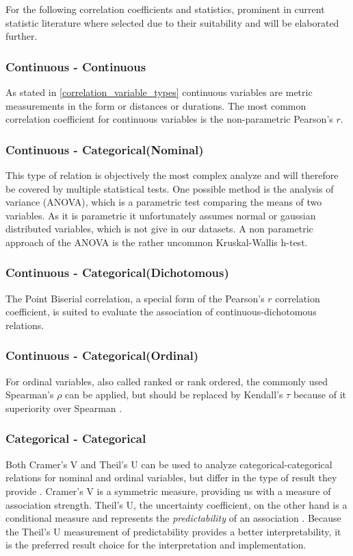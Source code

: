 \documentclass[a4paper,12pt]{report}
\begin{document}
For the following correlation coefficients and statistics, prominent in current statistic literature where selected due to their suitability and will be elaborated further.

\subsubsection{Continuous - Continuous}
As stated in \ref{correlation_variable_types} continuous variables are metric measurements in the form or distances or durations. The most common correlation coefficient for continuous variables is the non-parametric Pearson's $r$.

\subsubsection{Continuous - Categorical(Nominal)}
This type of relation is objectively the most complex analyze and will therefore be covered by multiple statistical tests. One possible method is the analysis of variance (ANOVA), which is a parametric test comparing the means of two variables. As it is parametric it unfortunately assumes normal or gaussian distributed variables, which is not give in our datasets. A non parametric approach of the ANOVA is the rather uncommon Kruskal-Wallis h-test. \cite{Leon1998}

\subsubsection{Continuous - Categorical(Dichotomous)}
The Point Biserial correlation, a special form of the Pearson's $r$ correlation coefficient, is suited to evaluate the association of continuous-dichotomous relations. 

\subsubsection{Continuous - Categorical(Ordinal)}
For ordinal variables, also called ranked or rank ordered, the commonly used Spearman's $\rho$ can be applied, but should be replaced by Kendall's $\tau$ because of it superiority over Spearman \cite{Newson2002}. 

\subsubsection{Categorical - Categorical}

Both Cramer’s V and Theil’s U can be used to analyze categorical-categorical relations for nominal and ordinal variables, but differ in the type of result they provide \cite{OutsideTwoStandardDeviations2018}. Cramer’s V is a symmetric measure, providing us with a measure of association strength. Theil’s U, the uncertainty coefficient, on the other hand is a conditional measure and represents the \textit{predictability} of an association \cite{Akoglu2018,StackExchange2020}. Because the Theil’s U measurement of predictability provides a better interpretability, it is the preferred  result choice for the interpretation and implementation. 
\end{document}
